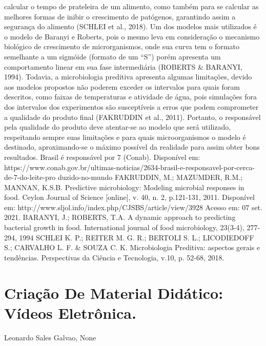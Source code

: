 calcular o tempo de prateleira de um alimento, como também para se calcular as melhores
formas de inibir o crescimento de patógenos, garantindo assim a segurança do alimento
(SCHLEI et al., 2018). Um dos modelos mais utilizados é o modelo de Baranyi e Roberts, pois o
mesmo leva em consideração o mecanismo biológico de crescimento de microrganismos, onde
sua curva tem o formato semelhante a um sigmóide (formato de um “S”) porém apresenta um
comportamento linear em sua fase intermediária (ROBERTS \& BARANYI, 1994). Todavia, a
microbiologia preditiva apresenta algumas limitações, devido aos modelos propostos não
poderem exceder os intervalos para quais foram descritos, como faixas de temperaturas e
atividade de água, pois simulações fora dos intervalos dos experimentos são susceptíveis a erros
que podem comprometer a qualidade do produto final (FAKRUDDIN et al., 2011). Portanto, o
responsável pela qualidade do produto deve atentar-se ao modelo que será utilizado, respeitando
sempre suas limitações e para quais microorganismos o modelo é destinado, aproximando-se o
máximo possível da realidade para assim obter bons resultados.
Brasil é responsável por 7%
(Conab). Disponível em:
https://www.conab.gov.br/ultimas-noticias/2634-brasil-e-responsavel-por-cerca-de-7-do-leite-pro
duzido-no-mundo
FAKRUDDIN, M.; MAZUMDER, R.M.; MANNAN, K.S.B. Predictive microbiology:
Modeling microbial responses in food. Ceylon Journal of Science [online], v. 40, n. 2,
p.121-131, 2011. Disponível em: http://www.sljol.info/index.php/CJSBS/article/view/3928
Acesso em: 07 set. 2021.
BARANYI, J.; ROBERTS, T.A. A dynamic approach to predicting bacterial growth in food.
International journal of food microbiology, 23(3-4), 277-294, 1994
SCHLEI K. P.; REITER M. G. R.; BERTOLI S. L.; LICODIEDOFF S.; CARVALHO L. F. \&
SOUZA C. K. Microbiologia Preditiva: aspectos gerais e tendências. Perspectivas da
Ciência e Tecnologia, v.10, p. 52-68, 2018.




\section*{Criação De Material Didático: Vídeos Eletrônica.}

Leonardo Sales Galvao, None

